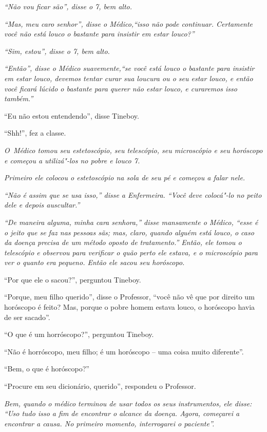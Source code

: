 \emph{``Não vou ficar são'', disse o 7, bem alto.}

\emph{``Mas, meu caro senhor'', disse o Médico,``isso não pode
continuar. Certamente você não está louco o bastante para insistir em
estar louco?''}

\emph{``Sim, estou'', disse o 7, bem alto.}

\emph{``Então'', disse o Médico suavemente,``se você está louco o
bastante para insistir em estar louco, devemos tentar curar sua loucura
ou o seu estar louco, e então você ficará lúcido o bastante para querer
não estar louco, e curaremos isso também.''}

``Eu não estou entendendo'', disse Tineboy.

``Shh!'', fez a classe.

\emph{O~Médico tomou seu estetoscópio, seu telescópio, seu microscópio e
seu horóscopo e começou a utilizá"-los no pobre e louco 7.}

\emph{Primeiro ele colocou o estetoscópio na sola de seu pé e começou a
falar nele.}

\emph{``Não é assim que se usa isso,'' disse a Enfermeira. ``Você deve
colocá"-lo no peito dele e depois auscultar.''}

\emph{``De maneira alguma, minha cara senhora,'' disse mansamente o
Médico, ``esse é o jeito que se faz nas pessoas sãs; mas, claro, quando
alguém está louco, o caso da doença precisa de um método oposto de
tratamento.'' Então, ele tomou o telescópio e observou para verificar o
quão perto ele estava, e o microscópio para ver o quanto era pequeno.
Então ele sacou seu horóscopo.}

``Por que ele o sacou?'', perguntou Tineboy.

``Porque, meu filho querido'', disse o Professor, ``você não vê que por
direito um horóscopo é feito? Mas, porque o pobre homem estava louco, o
horóscopo havia de ser sacado''.

``O que é um horróscopo?'', perguntou Tineboy.

``Não é horróscopo, meu filho; é um horóscopo -- uma coisa muito
diferente''.

``Bem, o que é horóscopo?''

``Procure em seu dicionário, querido'', respondeu o Professor.

\emph{Bem, quando o médico terminou de usar todos os seus instrumentos,
ele disse: ``Uso tudo isso a fim de encontrar o alcance da doença.
Agora, começarei a encontrar a causa. No primeiro momento, interrogarei
o paciente''.}

